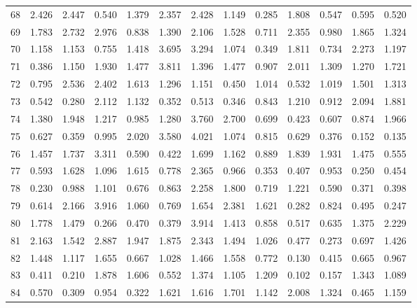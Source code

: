 \begin{tabular}{lrrrrrrrrrrrr}
68  &  2.426 &  2.447 &  0.540 &  1.379 &  2.357 &  2.428 &  1.149 &  0.285 &  1.808 &  0.547 &  0.595 &  0.520 \\
69  &  1.783 &  2.732 &  2.976 &  0.838 &  1.390 &  2.106 &  1.528 &  0.711 &  2.355 &  0.980 &  1.865 &  1.324 \\
70  &  1.158 &  1.153 &  0.755 &  1.418 &  3.695 &  3.294 &  1.074 &  0.349 &  1.811 &  0.734 &  2.273 &  1.197 \\
71  &  0.386 &  1.150 &  1.930 &  1.477 &  3.811 &  1.396 &  1.477 &  0.907 &  2.011 &  1.309 &  1.270 &  1.721 \\
72  &  0.795 &  2.536 &  2.402 &  1.613 &  1.296 &  1.151 &  0.450 &  1.014 &  0.532 &  1.019 &  1.501 &  1.313 \\
73  &  0.542 &  0.280 &  2.112 &  1.132 &  0.352 &  0.513 &  0.346 &  0.843 &  1.210 &  0.912 &  2.094 &  1.881 \\
74  &  1.380 &  1.948 &  1.217 &  0.985 &  1.280 &  3.760 &  2.700 &  0.699 &  0.423 &  0.607 &  0.874 &  1.966 \\
75  &  0.627 &  0.359 &  0.995 &  2.020 &  3.580 &  4.021 &  1.074 &  0.815 &  0.629 &  0.376 &  0.152 &  0.135 \\
76  &  1.457 &  1.737 &  3.311 &  0.590 &  0.422 &  1.699 &  1.162 &  0.889 &  1.839 &  1.931 &  1.475 &  0.555 \\
77  &  0.593 &  1.628 &  1.096 &  1.615 &  0.778 &  2.365 &  0.966 &  0.353 &  0.407 &  0.953 &  0.250 &  0.454 \\
78  &  0.230 &  0.988 &  1.101 &  0.676 &  0.863 &  2.258 &  1.800 &  0.719 &  1.221 &  0.590 &  0.371 &  0.398 \\
79  &  0.614 &  2.166 &  3.916 &  1.060 &  0.769 &  1.654 &  2.381 &  1.621 &  0.282 &  0.824 &  0.495 &  0.247 \\
80  &  1.778 &  1.479 &  0.266 &  0.470 &  0.379 &  3.914 &  1.413 &  0.858 &  0.517 &  0.635 &  1.375 &  2.229 \\
81  &  2.163 &  1.542 &  2.887 &  1.947 &  1.875 &  2.343 &  1.494 &  1.026 &  0.477 &  0.273 &  0.697 &  1.426 \\
82  &  1.448 &  1.117 &  1.655 &  0.667 &  1.028 &  1.466 &  1.558 &  0.772 &  0.130 &  0.415 &  0.665 &  0.967 \\
83  &  0.411 &  0.210 &  1.878 &  1.606 &  0.552 &  1.374 &  1.105 &  1.209 &  0.102 &  0.157 &  1.343 &  1.089 \\
84  &  0.570 &  0.309 &  0.954 &  0.322 &  1.621 &  1.616 &  1.701 &  1.142 &  2.008 &  1.324 &  0.465 &  1.159 \\

\end{tabular}
